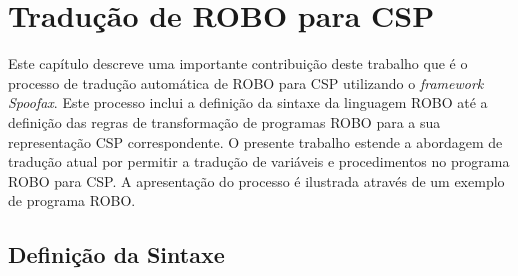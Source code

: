 \chapter{Tradução de ROBO para CSP}
\label{chap:cap3}

Este capítulo descreve uma importante contribuição deste trabalho que é o processo de tradução automática de ROBO para CSP utilizando o \textit{framework} \textit{Spoofax}. Este processo inclui a definição da sintaxe da linguagem ROBO até a definição das regras de transformação de programas ROBO para a sua representação CSP correspondente. O presente trabalho estende a abordagem de tradução atual por permitir a tradução de variáveis e procedimentos no programa ROBO para CSP.  A apresentação do processo é ilustrada através de um exemplo de programa ROBO.


\section{Definição da Sintaxe}

